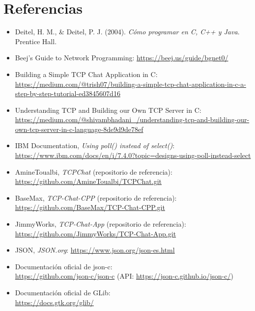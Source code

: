 \documentclass[12pt,a4paper]{article}
\begin{document}
\section{Referencias}

\begin{itemize}
    \item Deitel, H. M., \& Deitel, P. J. (2004). \textit{Cómo programar en C, C++ y Java}. Prentice Hall.
    \item Beej's Guide to Network Programming: \url{https://beej.us/guide/bgnet0/}
    \item Building a Simple TCP Chat Application in C:\\ \url{https://medium.com/@trish07/building-a-simple-tcp-chat-application-in-c-a-step-by-step-tutorial-ed3845607d16}
    \item Understanding TCP and Building our Own TCP Server in C:\\ \url{https://medium.com/@shivambhadani_/understanding-tcp-and-building-our-own-tcp-server-in-c-language-8de9d9de78ef}
    \item IBM Documentation, \textit{Using poll() instead of select()}:\\ \url{https://www.ibm.com/docs/en/i/7.4.0?topic=designs-using-poll-instead-select}
    \item AmineToualbi, \textit{TCPChat} (repositorio de referencia):\\ \url{https://github.com/AmineToualbi/TCPChat.git}
    \item BaseMax, \textit{TCP-Chat-CPP} (repositorio de referencia): \\\url{https://github.com/BaseMax/TCP-Chat-CPP.git}
    \item JimmyWorks, \textit{TCP-Chat-App} (repositorio de referencia):\\ \url{https://github.com/JimmyWorks/TCP-Chat-App.git}
    \item JSON, \textit{JSON.org}: \url{https://www.json.org/json-es.html}
    \item Documentación oficial de json-c:\\ \url{https://github.com/json-c/json-c} (API: \url{https://json-c.github.io/json-c/})
    \item Documentación oficial de GLib:\\ \url{https://docs.gtk.org/glib/}
\end{itemize}

\appendix
\end{document}
